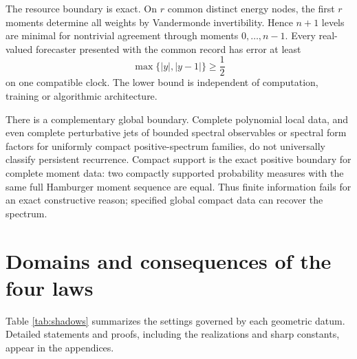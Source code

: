 \documentclass[10pt]{article}
\theoremstyle{definition}
\begin{document}
The resource boundary is exact.  On $r$ common distinct energy nodes, the
first $r$ moments determine all weights by Vandermonde invertibility.
Hence $n+1$ levels are minimal for nontrivial agreement through moments
$0,\ldots,n-1$.  Every real-valued forecaster presented with the common
record has error at least
\begin{equation}
 \max\{|y|,|y-1|\}\ge\frac12                          \label{eq:halfforecast}
\end{equation}
on one compatible clock.  The lower bound is independent of computation,
training or algorithmic architecture.

There is a complementary global boundary.  Complete polynomial local data,
and even complete perturbative jets of bounded spectral observables or
spectral form factors for uniformly compact positive-spectrum families, do
not universally classify persistent recurrence.  Compact support is the
exact positive boundary for complete moment data: two compactly supported
probability measures with the same full Hamburger moment sequence are equal.
Thus finite information fails for an exact constructive reason; specified
global compact data can recover the spectrum.

\section{Domains and consequences of the four laws}

Table \ref{tab:shadows} summarizes the settings governed by each geometric
datum.  Detailed statements and proofs, including the realizations and sharp
constants, appear in the appendices.
\end{document}
